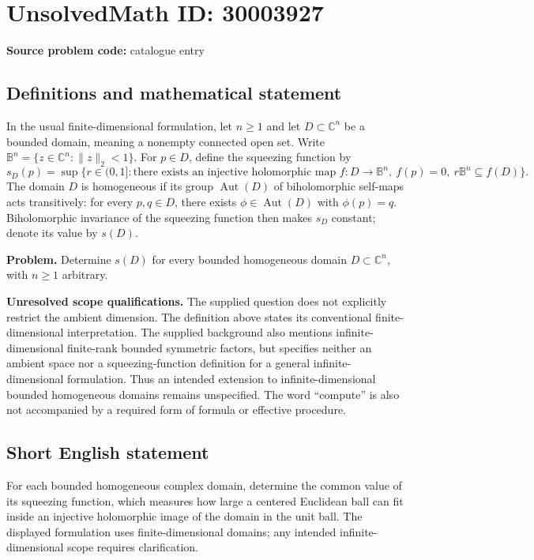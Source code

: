 \documentclass[11pt]{article}
\newcommand{\C}{\mathbb{C}}
\begin{document}
\section*{UnsolvedMath ID: 30003927}
\textbf{Source problem code:} catalogue entry
\subsection{Definitions and mathematical statement}
In the usual finite-dimensional formulation, let \(n\geq 1\) and let \(D\subset\C^n\) be a bounded domain, meaning a nonempty connected open set. Write \(\mathbb B^n=\{z\in\C^n:\|z\|_2<1\}\). For \(p\in D\), define the squeezing function by
\[
s_D(p)=\sup\bigl\{r\in(0,1]:\text{there exists an injective holomorphic map }f:D\to\mathbb B^n,\ f(p)=0,\ r\mathbb B^n\subseteq f(D)\bigr\}.
\]
The domain \(D\) is homogeneous if its group \(\operatorname{Aut}(D)\) of biholomorphic self-maps acts transitively: for every \(p,q\in D\), there exists \(\phi\in\operatorname{Aut}(D)\) with \(\phi(p)=q\). Biholomorphic invariance of the squeezing function then makes \(s_D\) constant; denote its value by \(s(D)\).

\textbf{Problem.} Determine \(s(D)\) for every bounded homogeneous domain \(D\subset\C^n\), with \(n\geq1\) arbitrary.

\textbf{Unresolved scope qualifications.} The supplied question does not explicitly restrict the ambient dimension. The definition above states its conventional finite-dimensional interpretation. The supplied background also mentions infinite-dimensional finite-rank bounded symmetric factors, but specifies neither an ambient space nor a squeezing-function definition for a general infinite-dimensional formulation. Thus an intended extension to infinite-dimensional bounded homogeneous domains remains unspecified. The word ``compute'' is also not accompanied by a required form of formula or effective procedure.
\subsection{Short English statement}
For each bounded homogeneous complex domain, determine the common value of its squeezing function, which measures how large a centered Euclidean ball can fit inside an injective holomorphic image of the domain in the unit ball. The displayed formulation uses finite-dimensional domains; any intended infinite-dimensional scope requires clarification.
\end{document}
